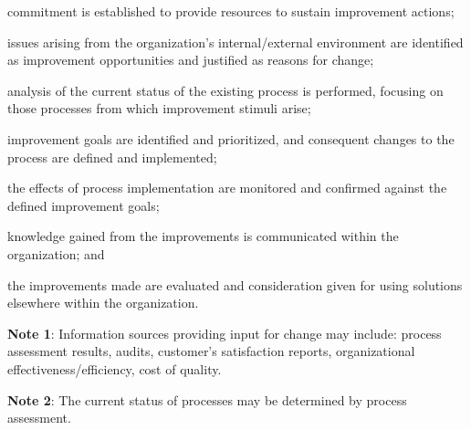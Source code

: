 			\begin{adjustwidth}{2em}{0pt} 

				\begin{compactitem}

					\item commitment is established to provide resources to sustain improvement actions;

					\item issues arising from the organization's internal/external environment are identified as improvement opportunities and justified as reasons for change;

					\item analysis of the current status of the existing process is performed, focusing on those processes from which improvement stimuli arise;
					
					\item improvement goals are identified and prioritized, and consequent changes to the process are defined and implemented; 					

					\item the effects of process implementation are monitored and confirmed against the defined improvement goals;
					
					\item knowledge gained from the improvements is communicated within the organization; and

					\item the improvements made are evaluated and consideration given for using solutions elsewhere within the organization.

				\end{compactitem}


				{\bf Note 1}: Information sources providing input for change may include: process assessment results, audits, customer's satisfaction reports, organizational effectiveness/efficiency, cost of quality.

				{\bf Note 2}: The current status of processes may be determined by process assessment.


			\end{adjustwidth}


	\newpage
